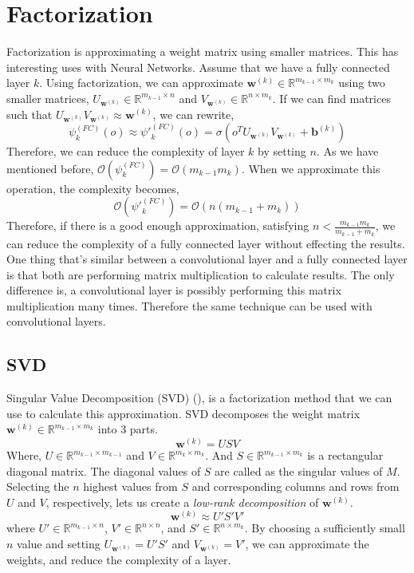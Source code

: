 \section{Factorization}
Factorization is approximating a weight matrix using smaller matrices. This has interesting uses with Neural Networks. Assume that we have a fully connected layer $k$. Using factorization, we can approximate $\mathbf{w}^{(k)} \in \mathbb{R}^{m_{k-1} \times m_k}$ using two smaller matrices, $U_{\mathbf{w}^{(k)}} \in \mathbb{R}^{m_{k-1} \times n}$ and $V_{\mathbf{w}^{(k)}} \in \mathbb{R}^{n \times m_{k}}$. If we can find matrices such that $U_{\mathbf{w}^{(k)}}V_{\mathbf{w}^{(k)}} \approx \mathbf{w}^{(k)}$, we can rewrite, 
$$\psi^{(FC)}_k(o) \approx \psi'^{(FC)}_k(o) = \sigma(o^T U_{\mathbf{w}^{(k)}}V_{\mathbf{w}^{(k)}} +\mathbf{b}^{(k)})$$
Therefore, we can reduce the complexity of layer $k$ by setting $n$. As we have mentioned before, $\mathcal{O}(\psi_k^{(FC)}) = \mathcal{O}(m_{k-1}m_k)$. When we approximate this operation, the complexity becomes, 
$$\mathcal{O}(\psi'^{(FC)}_k) = \mathcal{O}(n(m_{k-1}+m_k))$$
Therefore, if there is a good enough approximation, satisfying $n < \frac{m_{k-1}m_k}{m_{k-1}+m_k}$, we can reduce the complexity of a fully connected layer without effecting the results.
One thing that's similar between a convolutional layer and a fully connected layer is that both are performing matrix multiplication to calculate results. The only difference is, a convolutional layer is possibly performing this matrix multiplication many times. Therefore the same technique can be used with convolutional layers. 


\subsection{SVD}
Singular Value Decomposition (SVD) (\cite{golub1970singular}), is a factorization method that we can use to calculate this approximation. SVD decomposes the weight matrix $\mathbf{w}^{(k)} \in \mathbb{R}^{m_{k-1} \times m_k}$ into $3$ parts. 
$$ \mathbf{w}^{(k)} = USV $$
Where, $U \in \mathbb{R}^{m_{k-1} \times m_{k-1}}$ and $V\in \mathbb{R}^{m_{k} \times m_k}$. And $S \in \mathbb{R}^{m_{k-1} \times m_k}$ is a rectangular diagonal matrix. The diagonal values of $S$ are called as the singular values of $M$. Selecting the $n$ highest values from $S$ and corresponding columns and rows from $U$ and $V$, respectively, lets us create a \textit{low-rank decomposition} of $\mathbf{w}^{(k)}$. 
$$ \mathbf{w}^{(k)} \approx U'S'V' $$
where $U' \in \mathbb{R}^{m_{k-1} \times n}$, $V' \in \mathbb{R}^{n \times n}$, and $S' \in \mathbb{R}^{n \times m_k}$. By choosing a sufficiently small $n$ value and setting $U_{\mathbf{w}^{(k)}}=U'S'$ and $V_{\mathbf{w}^{(k)}} = V'$, we can approximate the weights, and reduce the complexity of a layer.

